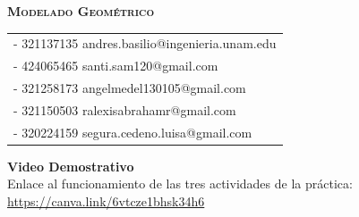 \documentclass[a4paper, 11pt]{article}
\begin{document}
\newpage

\begin{center}
    \vspace{50cm}
    {\Large\scshape\textbf{Modelado Geométrico}}\\[.5in]
\end{center}

\begin{tabular}[t]{l}
    - 321137135 andres.basilio@ingenieria.unam.edu \\[0.5cm]
    - 424065465 santi.sam120@gmail.com \\[0.5cm]
    - 321258173 angelmedel130105@gmail.com\\[0.5cm]
    - 321150503 ralexisabrahamr@gmail.com \\[0.5cm]
    - 320224159 segura.cedeno.luisa@gmail.com \\[0.5cm]
\end{tabular}

\newpage









\vspace{1.5cm}
\begin{center}
    \Large\textbf{Video Demostrativo} \\[0.5cm]
    \normalsize
    Enlace al funcionamiento de las tres actividades de la práctica: \\[0.3cm]
    \url{https://canva.link/6vtcze1bhsk34h6}
\end{center}
\end{document}
